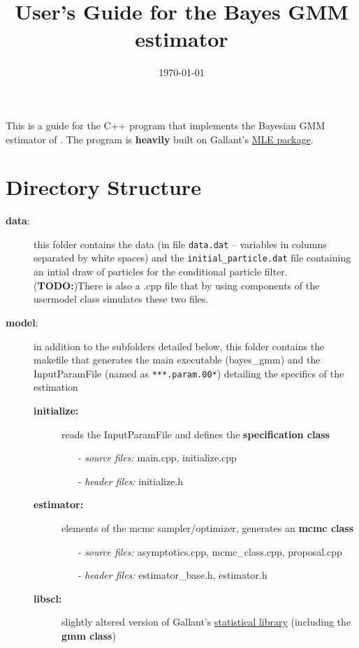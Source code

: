 \documentclass[11pt, letterpaper, notitlepage]{article}
\title{User's Guide for the Bayes GMM estimator}
\author{}
\date{\today}
\begin{document}
\maketitle

\setlength{\parskip}{9pt}
\setlength{\parindent}{0pt}

This is a guide for the C++ program that implements the Bayesian GMM estimator of \cite{GGR_2017}. The program is \textbf{heavily} built on Gallant's \href{https://www.aronaldg.org/webfiles/mle/}{MLE package}.   

\section*{Directory Structure}

\begin{description}
\item[\textbf{data}:] this folder contains the data (in file \texttt{data.dat} -- variables in columns separated by white spaces) and the \texttt{initial\_particle.dat} file containing an intial draw of particles for the conditional particle filter. (\textbf{TODO:})There is also a .cpp file that by using components of the usermodel class simulates these two files.   
\item[\textbf{model}:] in addition to the subfolders detailed below, this folder contains the makefile that generates the main executable (bayes\_gmm) and the InputParamFile (named as \texttt{***.param.00*}) detailing the specifics of the estimation 
\begin{description}
\item[\textbf{initialize:}] reads the InputParamFile and defines the \textbf{specification class}
\begin{itemize}
\item[-] \emph{source files:} main.cpp, initialize.cpp 
\item[-] \emph{header files:} initialize.h 
\end{itemize}
\item[\textbf{estimator:}] elements of the mcmc sampler/optimizer, generates an \textbf{mcmc class}
\begin{itemize}
\item[-] \emph{source files:} asymptotics.cpp, mcmc\_class.cpp, proposal.cpp 
\item[-] \emph{header files:} estimator\_base.h, estimator.h 
\end{itemize}
\item[\textbf{libscl:}] slightly altered version of Gallant's \href{https://www.aronaldg.org/webfiles/libscl}{statistical library} (including the \textbf{gmm class}) 

\end{description}
\end{description}
\end{document}
